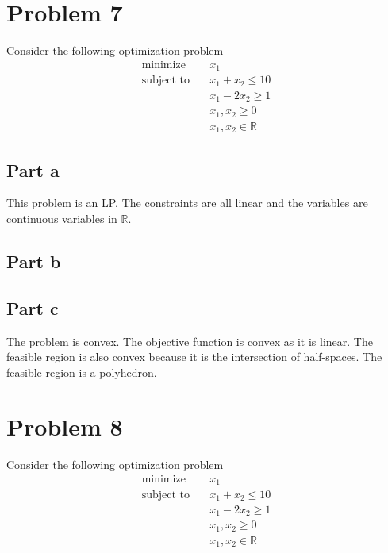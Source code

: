 \documentclass[11pt]{article}
\begin{document}
\section{Problem 7}
Consider the following optimization problem
\begin{align}
  \text{minimize} & \quad x_1 \\
  \text{subject to} & \quad x_1 + x_2 \leq 10 \\
  & \quad x_1 - 2x_2 \geq 1 \\
  & \quad x_1, x_2 \geq 0 \\
  & \quad x_1, x_2 \in \mathbb{R}
\end{align}

\subsection{Part a}
This problem is an LP. The constraints are all linear and the variables are continuous variables in $\mathbb{R}$.

\subsection{Part b}


\subsection{Part c}

The problem is convex. 
The objective function is convex as it is linear. 
The feasible region is also convex because it is the intersection of half-spaces.
The feasible region is a polyhedron.

\section{Problem 8}Consider the following optimization problem
\begin{align}
  \text{minimize} & \quad x_1 \\
  \text{subject to} & \quad x_1 + x_2 \leq 10 \\
  & \quad x_1 - 2x_2 \geq 1 \\
  & \quad x_1, x_2 \geq 0 \\
  & \quad x_1, x_2 \in \mathbb{R}
\end{align}
\end{document}
